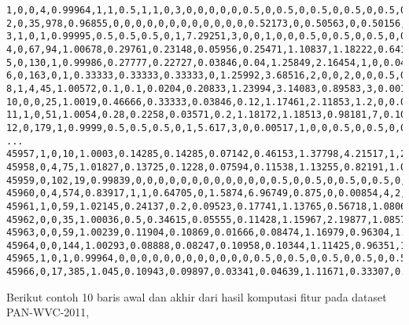 \begin{lstlisting}[style=data,basicstyle=\tiny\ttfamily]
1,0,0,4,0.99964,1,1,0.5,1,1,0,3,0,0,0,0,0,0.5,0,0.5,0,0.5,0,0.5,0,0.5,0,0.5,0
2,0,35,978,0.96855,0,0,0,0,0,0,0,0,0,0,0,0,0.52173,0,0.50563,0,0.50156,0,0.5,0,0.5283,0,0.50534,0
3,1,0,1,0.99995,0.5,0.5,0.5,0,1,7.29251,3,0,0,1,0,0,0.5,0,0.5,0,0.5,0,0.5,0,0.5,0,0.5,0
4,0,67,94,1.00678,0.29761,0.23148,0.05956,0.25471,1.10837,1.18222,0.6415,12,0.02692,10,2,0,0.65,0.3,0.72838,0,0.60606,0,0.5,0,0.77906,0,0.72837,0
5,0,130,1,0.99986,0.27777,0.22727,0.03846,0.04,1.25849,2.16454,1,0,0.04682,8,0,0,0.5,0.5,0.5,0,0.5,0,0.5,0,0.5,0,0.5,0
6,0,163,0,1,0.33333,0.33333,0.33333,0,1.25992,3.68516,2,0,0,2,0,0,0.5,0,0.5,0,0.5,0,0.5,0,0.5,0,0.5,0
8,1,4,45,1.00572,0.1,0.1,0.0204,0.20833,1.23994,3.14083,0.89583,3,0.00119,39,2,0,0.5,1,0.49947,0,0.5,0,0.5,0,0.5,0,0.49954,0
10,0,0,25,1.0019,0.46666,0.33333,0.03846,0.12,1.17461,2.11853,1.2,0,0.02034,9,0,0,0.5,1,0.5,0,0.5,0,0.5,0,0.5,0,0.5,0
11,1,0,51,1.0054,0.28,0.2258,0.03571,0.2,1.18172,1.18513,0.98181,7,0.10029,7,2,0,0.5,0.22222,0.49803,0,0.5,0,0.5,0,0.48979,0,0.49683,0
12,0,179,1,0.9999,0.5,0.5,0.5,0,1,5.617,3,0,0.00517,1,0,0,0.5,0,0.5,0,0.5,0,0.5,0,0.5,0,0.5,0
...
45957,1,0,10,1.0003,0.14285,0.14285,0.07142,0.46153,1.37798,4.21517,1,2,0,0,0,0,0.5,0,0.5,0,0.5,0,0.5,0,0.5,0,0.5,0
45958,0,4,75,1.01827,0.13725,0.1228,0.07594,0.11538,1.13255,0.82191,1.07692,4,0.01506,10,2,0,0.5,0.71428,0.4946,0,0.5,0,0.5,0,0.5,0,0.49514,0
45959,0,102,19,0.99839,0,0,0,0,0,0,0,0,0,0,0,0,0.5,0,0.5,0,0.5,0,0.5,0,0.5,0,0.5,0
45960,0,4,574,0.83917,1,1,0.64705,0,1.5874,6.96749,0.875,0,0.00854,4,2,0,0.57142,0,0.52857,0,0.5,0,0.5,0,0.54545,0,0.52996,0
45961,1,0,59,1.02145,0.24137,0.2,0.09523,0.17741,1.13765,0.56718,1.08064,8,0.38073,8,2,0,0.5,0.36363,0.49523,0,0.5,0,0.5,0,0.5,0,0.49557,0
45962,0,0,35,1.00036,0.5,0.34615,0.05555,0.11428,1.15967,2.19877,1.08571,1,0.06435,11,2,0,0.5,0.83333,0.5,0,0.5,0,0.5,0,0.5,0,0.5,0
45963,0,0,59,1.00239,0.11904,0.10869,0.01666,0.08474,1.16979,0.96304,1.03389,3,0.08203,10,2,0,0.5,0.75,0.49878,0,0.5,0,0.5,0,0.5,0,0.49891,0
45964,0,0,144,1.00293,0.08888,0.08247,0.10958,0.10344,1.11425,0.96351,1.01379,3,0,0,2,0,0.5,0,0.5,0,0.5,0,0.5,0,0.5,0,0.5,0
45965,1,0,1,0.99964,0,0,0,0,0,0,0,0,0,0,0,0,0.5,0,0.5,0,0.5,0,0.5,0,0.5,0,0.5,0
45966,0,17,385,1.045,0.10943,0.09897,0.03341,0.04639,1.11671,0.33307,0.76288,4,0.0851,11,2,0.01562,0.5,0.54687,0.5,0,0.5,0,0.5,0,0.5,0,0.5,0
\end{lstlisting}

Berikut contoh 10 baris awal dan akhir dari hasil komputasi fitur pada dataset
PAN-WVC-2011,

